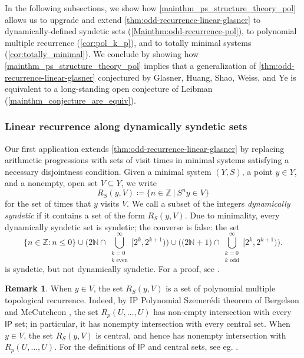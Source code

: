 \documentclass{article}
\theoremstyle{plain}
\theoremstyle{claim}
\theoremstyle{definition}
\newtheorem{remark}[Theorem]{Remark}
\theoremstyle{plain}
\theoremstyle{plain}
\newcommand{\Szemeredi}{Szemer\'{e}di}
\newcommand{\N}{\mathbb{N}}
\newcommand{\Z}{\mathbb{Z}}
\newcommand{\ip}{\mathsf{IP}}
\renewcommand{\leq}{\leqslant}
\newcommand{\1}{\boldsymbol{1}}
\newcommand{\defeq}{\coloneqq}
\begin{document}
In the following subsections, we show how \cref{mainthm_ps_structure_theory_pol} allows us to upgrade and extend \cref{thm:odd-recurrence-linear-glasner} to dynamically-defined syndetic sets (\cref{Mainthm:odd-recurrence-pol}), to polynomial multiple recurrence (\cref{cor:pol_k_p}), and to totally minimal systems (\cref{cor:totally_minimal}).
We conclude by showing how \cref{mainthm_ps_structure_theory_pol} implies that a generalization of \cref{thm:odd-recurrence-linear-glasner} conjectured by Glasner, Huang, Shao, Weiss, and Ye is equivalent to a long-standing open conjecture of Leibman (\cref{mainthm_conjecture_are_equiv}). 

\subsubsection{Linear recurrence along dynamically syndetic sets}
\label{sec_linear_rec_along_dy_synd_sets}

Our first application extends \cref{thm:odd-recurrence-linear-glasner} by replacing arithmetic progressions with sets of visit times in minimal systems satisfying a necessary disjointness condition. Given a minimal system $(Y,S)$, a point $y \in Y$, and a nonempty, open set $V \subseteq Y$, we write
\[R_S(y,V) \defeq \big\{ n \in \Z \ \big| \ S^n y \in V \big\}\]
for the set of times that $y$ visits $V$.
We call a subset of the integers {\it dynamically syndetic} if it contains a set of the form $R_S(y,V)$. Due to minimality, every dynamically syndetic set is syndetic; the converse is false: the set
\[
    \{n \in \Z: n \leq 0\} \cup \bigg( 2 \N \cap \bigcup_{\substack{k = 0 \\ \text{$k$ even}}}^\infty \big[ 2^{k}, 2^{k + 1}\big) \bigg) \cup \bigg( \big( 2\N + 1 \big) \cap \bigcup_{\substack{k = 0 \\ \text{$k$ odd}}}^\infty \big[ 2^{k}, 2^{k + 1}\big) \bigg).
\]
is syndetic, but not dynamically syndetic. For a proof, see \cite{glasscock_le_2024}.

\begin{remark}
    When $y \in V$, the set $R_S(y,V)$ is a set of polynomial multiple topological recurrence. Indeed, by IP Polynomial \Szemeredi{} theorem of Bergelson and McCutcheon \cite[Lemma 6.12]{Bergelson_McCutcheon00}, the set $R_p(U,\ldots,U)$ has non-empty intersection with every $\ip$ set; in particular, it has nonempty intersection with every central set. When $y \in V$, the set $R_S(y,V)$ is central, and hence has nonempty intersection with $R_p(U,\ldots,U)$. For the definitions of $\ip$ and central sets, see eg. \cite[Ch. 8.3]{Furstenberg81}.
\end{remark}
\end{document}
